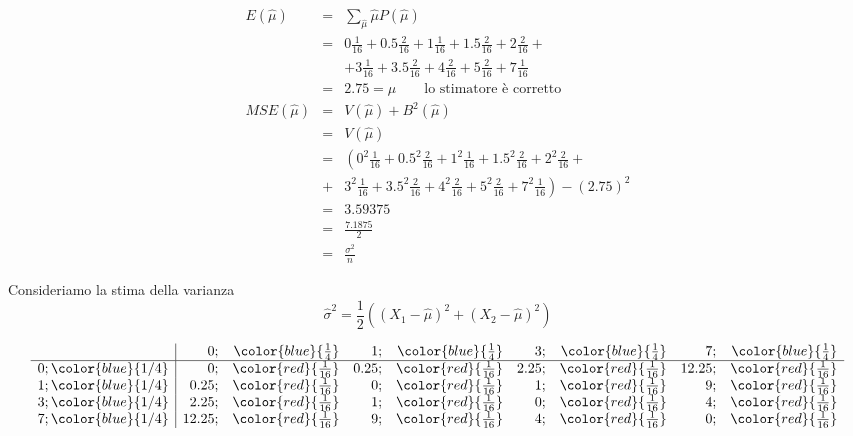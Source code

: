 \documentclass[
  11pt,
]{book}
\theoremstyle{mytheoremstyle}
\theoremstyle{mydefstyle}
\begin{document}
\begin{eqnarray*}  
  E(\hat\mu) &=& \sum_{\hat\mu}\hat\mu P(\hat\mu)\\ 
 &=&  0  \frac { 1 }{ 16 }+ 0.5  \frac { 2 }{ 16 }+ 1  \frac { 1 }{ 16 }+ 1.5  \frac { 2 }{ 16 }+ 2  \frac { 2 }{ 16 }+ \\
 & & +3  \frac { 1 }{ 16 }+ 3.5  \frac { 2 }{ 16 }+ 4  \frac { 2 }{ 16 }+ 5  \frac { 2 }{ 16 }+ 7  \frac { 1 }{ 16 } \\ 
            &=& 2.75 = \mu \qquad\text{lo stimatore è corretto} \\ 
 MSE(\hat\mu) &=& V(\hat\mu) + B^2(\hat\mu)\\ 
              &=& V(\hat\mu)\\
 &=&\left(  0  ^2\frac { 1 }{ 16 }+ 0.5  ^2\frac { 2 }{ 16 }+ 1  ^2\frac { 1 }{ 16 }+ 1.5  ^2\frac { 2 }{ 16 }+ 2  ^2\frac { 2 }{ 16 }+\right.\\
 &+& \left.  3  ^2\frac { 1 }{ 16 }+ 3.5  ^2\frac { 2 }{ 16 }+ 4  ^2\frac { 2 }{ 16 }+ 5  ^2\frac { 2 }{ 16 }+ 7  ^2\frac { 1 }{ 16 } \right)-( 2.75 )^2\\ 
            &=& 3.59375 \\
            &=& \frac{7.1875}{2}\\
            &=& \frac{\sigma^2}{n}
\end{eqnarray*}

Consideriamo la stima della varianza
\[
\hat\sigma^2=\frac 12\left((X_1-\hat\mu)^2+(X_2-\hat\mu)^2\right)
\]

\[
\begin{array}{ r|rrrrrrrr }
& 0 ;&\color{blue}{ \frac{ 1 } { 4 }} & 1 ;&\color{blue}{ \frac{ 1 } { 4 }} & 3 ;&\color{blue}{ \frac{ 1 } { 4 }} & 7 ;&\color{blue}{ \frac{ 1 } { 4 }} \\ 
\hline 
0 ;\color{blue}{ 1 / 4 }& 0;&\color{red}{\frac{1}{16}}& 0.25;&\color{red}{\frac{1}{16}}& 2.25;&\color{red}{\frac{1}{16}}& 12.25;&\color{red}{\frac{1}{16}}\\ 
1 ;\color{blue}{ 1 / 4 }& 0.25;&\color{red}{\frac{1}{16}}& 0;&\color{red}{\frac{1}{16}}& 1;&\color{red}{\frac{1}{16}}& 9;&\color{red}{\frac{1}{16}}\\ 
3 ;\color{blue}{ 1 / 4 }& 2.25;&\color{red}{\frac{1}{16}}& 1;&\color{red}{\frac{1}{16}}& 0;&\color{red}{\frac{1}{16}}& 4;&\color{red}{\frac{1}{16}}\\ 
7 ;\color{blue}{ 1 / 4 }& 12.25;&\color{red}{\frac{1}{16}}& 9;&\color{red}{\frac{1}{16}}& 4;&\color{red}{\frac{1}{16}}& 0;&\color{red}{\frac{1}{16}}\\ 
\end{array}
\]
\end{document}

